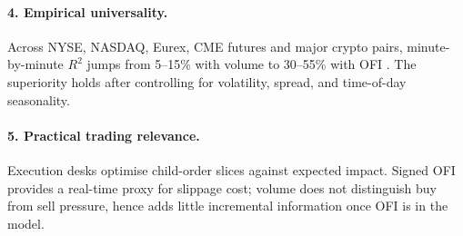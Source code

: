 \documentclass[11pt]{article}
\begin{document}
\paragraph{4. Empirical universality.}
Across NYSE, NASDAQ, Eurex, CME futures and major crypto pairs, minute-by-minute $R^{2}$ jumps from 5--15\% with volume to 30--55\% with OFI \citep{Benzaquen2017, Kolm2023}.  The superiority holds after controlling for volatility, spread, and time-of-day seasonality.

\paragraph{5. Practical trading relevance.}
Execution desks optimise child-order slices against expected impact.  Signed OFI provides a real-time proxy for slippage cost; volume does not distinguish buy from sell pressure, hence adds little incremental information once OFI is in the model.
\end{document}
